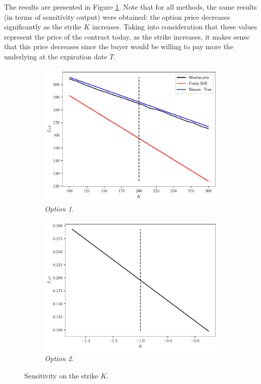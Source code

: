 \documentclass[11pt]{article}
\theoremstyle{definition}
\theoremstyle{remark}
\theoremstyle{remark}
\begin{document}
The results are presented in Figure \ref{fig:fourth_sens}. Note that for all
methods, the same results (in terms of sensitivity output) were obtained: the
option price decreases significantly as the strike $K$ increases. Taking into
consideration that these values represent the price of the contract today, as
the strike increases, it makes sense that this price decreases since the buyer
would be willing to pay more the underlying at the expiration date $T$.

\begin{figure}
  \centering
  \begin{subfigure}[b]{0.45\textwidth}
      \centering
      \includegraphics[scale=0.52]{../plts/fourth_sens_opt1.pdf}
      \caption{\textit{Option 1}.}
  \end{subfigure}
  \begin{subfigure}[b]{0.45\textwidth}
      \centering
      \includegraphics[scale=0.52]{../plts/fourth_sens_opt2.pdf}
      \caption{\textit{Option 2}.}
  \end{subfigure}
  \caption{Sensitivity on the strike $K$.}
  \label{fig:fourth_sens}
\end{figure}
\end{document}
